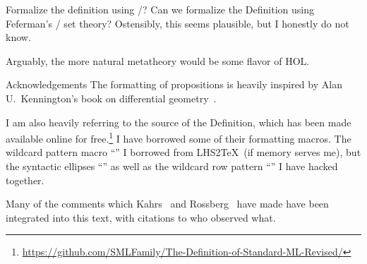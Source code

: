 \begin{comment}{Phases to the definition}
Again, we find in the first chapter of the 1997 Definition, the authors
explain (emphasis theirs):
\begin{quotation}
ML is an interactive language, and a \emph{program} consists of a
sequence of \emph{top-level declarations}; the execution of each
declaration modifies the top-level environment, which we call a
\emph{basis}, and reports the modification to the user.

In the execution of a declaration there are three phases:
\emph{parsing}, \emph{elaboration}, and \emph{evaluation}. Parsing
determines the grammatical form of a declaration. Elaboration, the
\emph{static} phase, determines whether it is well-typed and well-formed
in other ways, and records relevant type or form information in the
basis. Finally evaluation, the \emph{dynamic} phase, determines the
value of the declaration and records relevant value information in the
basis. Corresponding to these phases, our formal definition divides
into three parts: grammatical rules, elaboration rules, and evaluation
rules. Furthermore, the basis is divided into the \emph{static} basis
and the \emph{dynamic} basis; for example, a variable which has been
declared is associated with a type in the static basis and with a value
in the dynamic basis.
\end{quotation}
This gives us a clean way to order our discussion into three phases
(parsing, elaboration, and evaluation) and two sublanguages (Core and
Module). Since the Definition itself is structured in this manner, we
could use that fact to mirror its structure in our text.
\end{comment}

\begin{puzzle}{Formalize the definition using /?}
Can we formalize the Definition using Feferman's / set theory?
Ostensibly, this seems plausible, but I honestly do not know.

Arguably, the more natural metatheory would be some flavor of HOL.
\end{puzzle}

\begin{remark}{Acknowledgements}
The formatting of propositions is heavily inspired by Alan
U.\ Kennington's book on differential geometry~\cite{kennington2024dg}.

I am also heavily referring to the source of the Definition,
which has been made available online for free.\footnote{\url{https://github.com/SMLFamily/The-Definition-of-Standard-ML-Revised/}}
I have borrowed some of their formatting macros.
The wildcard pattern macro ``\wildcard'' I borrowed from LHS2\TeX\ (if
memory serves me), but the syntactic ellipses ``\syndots'' as well as
the wildcard row pattern ``\wildcardrow'' I have hacked together.

Many of the comments which Kahrs~\cite{kahrs1993mistakes,kahrs1996addenda}
and Rossberg~\cite{rossberg2018defects} have made have been integrated
into this text, with citations to who observed what.
\end{remark}